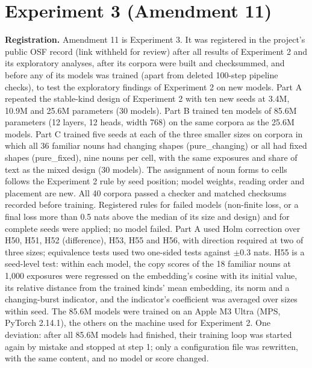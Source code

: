 \FloatBarrier
\section{Experiment 3 (Amendment 11)}\label{app:O}
\setcounter{table}{0}
\textbf{Registration.} Amendment 11 is Experiment 3. It was registered in the project's public OSF record (link withheld for review) after all results of Experiment 2 and its exploratory analyses, after its corpora were built and checksummed, and before any of its models was trained (apart from deleted 100-step pipeline checks), to test the exploratory findings of Experiment 2 on new models. Part A repeated the stable-kind design of Experiment 2 with ten new seeds at 3.4M, 10.9M and 25.6M parameters (30 models). Part B trained ten models of 85.6M parameters (12 layers, 12 heads, width 768) on the same corpora as the 25.6M models. Part C trained five seeds at each of the three smaller sizes on corpora in which all 36 familiar nouns had changing shapes (pure\_changing) or all had fixed shapes (pure\_fixed), nine nouns per cell, with the same exposures and share of text as the mixed design (30 models). The assignment of noun forms to cells follows the Experiment 2 rule by seed position; model weights, reading order and placement are new. All 40 corpora passed a checker and matched checksums recorded before training. Registered rules for failed models (non-finite loss, or a final loss more than 0.5 nats above the median of its size and design) and for complete seeds were applied; no model failed. Part A used Holm correction over H50, H51, H52 (difference), H53, H55 and H56, with direction required at two of three sizes; equivalence tests used two one-sided tests against $\pm$0.3 nats. H55 is a seed-level test: within each model, the copy scores of the 18 familiar nouns at 1,000 exposures were regressed on the embedding's cosine with its initial value, its relative distance from the trained kinds' mean embedding, its norm and a changing-burst indicator, and the indicator's coefficient was averaged over sizes within seed. The 85.6M models were trained on an Apple M3 Ultra (MPS, PyTorch 2.14.1), the others on the machine used for Experiment 2. One deviation: after all 85.6M models had finished, their training loop was started again by mistake and stopped at step 1; only a configuration file was rewritten, with the same content, and no model or score changed.

